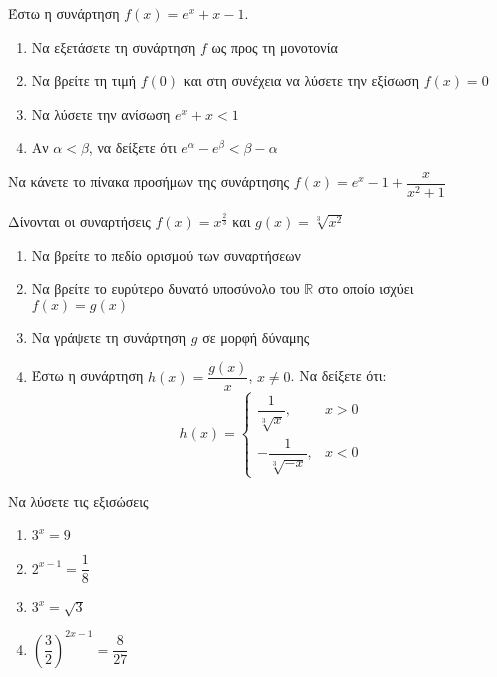\documentclass{../presentation}
\begin{document}
\begin{askisi}
  Έστω η συνάρτηση $f(x)=e^x+x-1$.
  \begin{enumerate}
    \item<1-> Να εξετάσετε τη συνάρτηση $f$ ως προς τη μονοτονία
    \item<2-> Να βρείτε τη τιμή $f(0)$ και στη συνέχεια να λύσετε την εξίσωση $f(x)=0$
    \item<3-> Να λύσετε την ανίσωση $e^x+x<1$
    \item<4-> Αν $α<β$, να δείξετε ότι $e^α-e^β<β-α$
  \end{enumerate}


\end{askisi}

\begin{askisi}
  Να κάνετε το πίνακα προσήμων της συνάρτησης $f(x)=e^x-1+\dfrac{x}{x^2+1}$


\end{askisi}

\begin{askisi}
  Δίνονται οι συναρτήσεις $f(x)=x^{\frac{2}{3}}$ και $g(x)=\sqrt[3]{x^2}$
  \begin{enumerate}
    \item<1-> Να βρείτε το πεδίο ορισμού των συναρτήσεων
    \item<2-> Να βρείτε το ευρύτερο δυνατό υποσύνολο του $\mathbb{R}$ στο οποίο ισχύει $f(x)=g(x)$
    \item<3-> Να γράψετε τη συνάρτηση $g$ σε μορφή δύναμης
    \item<4-> Έστω η συνάρτηση $h(x)=\dfrac{g(x)}{x}$, $x\ne 0$. Να δείξετε ότι:
          $$h(x)=\begin{cases}
              \dfrac{1}{\sqrt[3]{x}},   & x>0 \\
              -\dfrac{1}{\sqrt[3]{-x}}, & x<0
            \end{cases}$$
  \end{enumerate}


\end{askisi}

\begin{askisi}
  Να λύσετε τις εξισώσεις
  \begin{enumerate}
    \item<1-> $3^x=9$
    \item<2-> $2^{x-1}=\dfrac{1}{8}$
    \item<3-> $3^x=\sqrt{3}$
    \item<4-> $\left( \dfrac{3}{2} \right)^{2x-1}=\dfrac{8}{27}$
  \end{enumerate}


\end{askisi}
\end{document}
